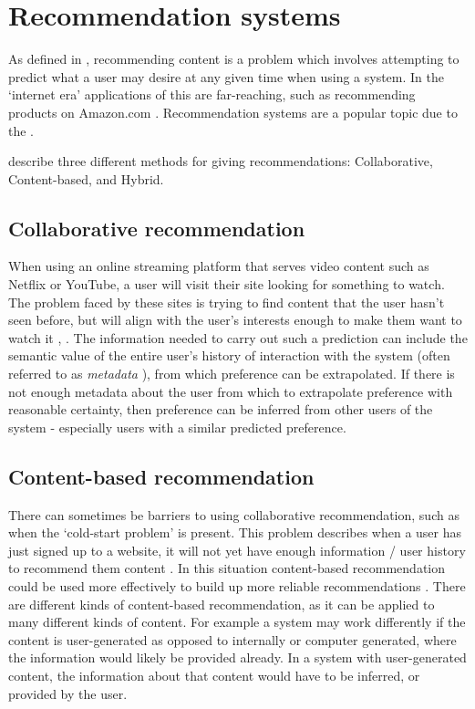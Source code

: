 \documentclass[a4paper,12pt]{report}
\begin{document}
  \section{Recommendation systems} \label{sec:lit-recc}
    As defined in \cite{ricci2011introduction}, recommending content is a problem which involves attempting to predict what a user may desire at any given time when using a system. In the ‘internet era’ applications of this are far-reaching, such as recommending products on Amazon.com \cite{linden2003amazon}. Recommendation systems are a popular topic due to the  \citep{adomavicius2005toward}.

    \cite{jannach2010recommender} describe three different methods for giving recommendations: Collaborative, Content-based, and Hybrid.

    \subsection{Collaborative recommendation}
      When using an online streaming platform that serves video content such as Netflix or YouTube, a user will visit their site looking for something to watch. The problem faced by these sites is trying to find content that the user hasn't seen before, but will align with the user's interests enough to make them want to watch it \citep{davidson2010youtube}, \citep{gomez2016netflix}.
      The information needed to carry out such a prediction can include the semantic value of the entire user's history of interaction with the system (often referred to as \textit{metadata} \citep{duval2002metadata}), from which preference can be extrapolated. If there is not enough metadata about the user from which to extrapolate preference with reasonable certainty, then preference can be inferred from other users of the system - especially users with a similar predicted preference.

    \subsection{Content-based recommendation}
      There can sometimes be barriers to using collaborative recommendation, such as when the ‘cold-start problem’ is present. This problem describes when a user has just signed up to a website, it will not yet have enough information / user history to recommend them content \citep{schein2002methods}.
      In this situation content-based recommendation could be used more effectively to build up more reliable recommendations \citep{lops2011content}.
      There are different kinds of content-based recommendation, as it can be applied to many different kinds of content. For example a system may work differently if the content is user-generated as opposed to internally or computer generated, where the information would likely be provided already. In a system with user-generated content, the information about that content would have to be inferred, or provided by the user.
\end{document}
